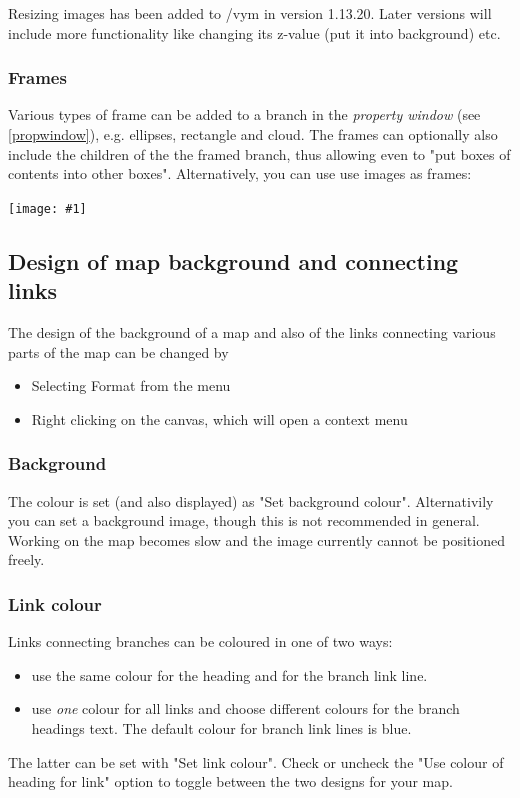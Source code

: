 \documentclass[12pt,a4paper]{article}
\newcommand{\maximage}[1]{  
    \begin{center}
        \texttt{[image: \#1]} 
    \end{center}
}
\begin{document}
Resizing images has been added to /vym in version 1.13.20. Later
versions will include more functionality like 
changing its z-value (put it into background) etc.

\subsubsection*{Frames}
Various types of frame can be added to a branch in the {\em property window} (see
\ref{propwindow}), e.g. ellipses, rectangle and cloud. The frames can
optionally also include the children of the the framed branch, thus
allowing even to "put boxes of contents into other boxes".
Alternatively, you can use use images as frames: 
\maximage{images/frames.png}

\subsection{Design of map background and connecting links }
The design of the background of a map and also of the links connecting
various parts of the map can be changed by
\begin{itemize}
    \item Selecting Format from the menu
    \item Right clicking on the canvas, which will open a context menu
\end{itemize}

\subsubsection*{Background }
The colour is set (and also displayed) as "Set background colour".
Alternativily you can set a background image, though this is not
recommended in general. Working on the map becomes slow and the image
currently cannot be positioned freely.

\subsubsection*{Link colour}
Links connecting branches can be coloured in one of two ways:
\begin{itemize}
    \item use the same colour for the heading and for the branch link
    line.
    \item use {\em one} colour for all links and choose different
    colours for the branch headings text. The default colour for branch
    link lines is blue.
\end{itemize}
The latter can be set with "Set link colour". Check or uncheck the "Use
colour of heading for link" option to toggle between the two designs for
your map.
\end{document}
